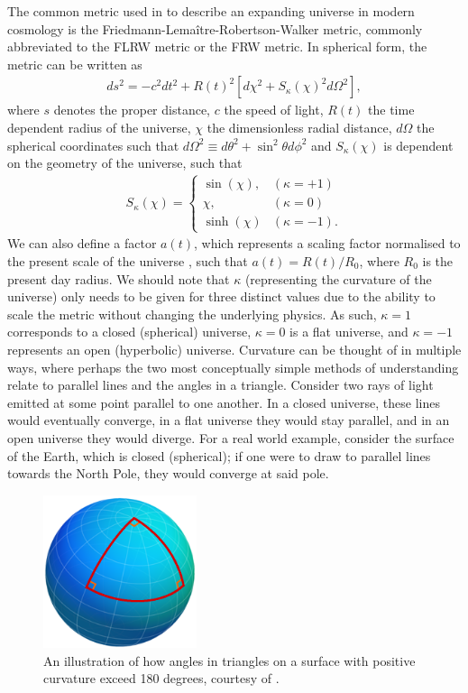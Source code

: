 \documentclass[titlesmallcaps, examinerscopy, copyrightpage]{uqthesis}
\begin{document}
The common metric used in to describe an expanding universe in modern cosmology is the Friedmann-Lema\^itre-Robertson-Walker metric, commonly abbreviated to the FLRW metric or the FRW metric. In spherical form, the metric can be written as
\begin{align}
ds^2 = -c^2 dt^2 + R(t)^2 \left[ d\chi^2 + S_\kappa(\chi)^2 d\Omega^2 \right], 
\end{align}
where $s$ denotes the proper distance, $c$ the speed of light, $R(t)$ the time dependent radius of the universe, $\chi$ the dimensionless radial distance, $d\Omega$ the spherical coordinates such that $d\Omega^2 \equiv d\theta^2 + \sin^2\theta d\phi^2$ and $S_\kappa(\chi)$ is dependent on the geometry of the universe, such that
\begin{align}
S_\kappa(\chi) = \begin{cases}
    \sin(\chi), & (\kappa = +1)\\
    \chi, & (\kappa = 0) \\
    \sinh (\chi) & (\kappa = -1).
  \end{cases}
\end{align}
We can also define a factor $a(t)$, which represents a scaling factor normalised to the present scale of the universe \citep{RydenPartridge2004}, such that $a(t) = R(t)/R_0$, where $R_0$ is the present day radius. We should note that $\kappa$ (representing the curvature of the universe) only needs to be given for three distinct values due to the ability to scale the metric without changing the underlying physics. As such, $\kappa = 1$ corresponds to a closed (spherical) universe, $\kappa = 0$ is a flat universe, and $\kappa = -1$ represents an open (hyperbolic) universe. Curvature can be thought of in multiple ways, where perhaps the two most conceptually simple methods of understanding relate to parallel lines and the angles in a triangle. Consider two rays of light emitted at some point parallel to one another. In a closed universe, these lines would eventually converge, in a flat universe they would stay parallel, and in an open universe they would diverge. For a real world example, consider the surface of the Earth, which is closed (spherical); if one were to draw to parallel lines towards the North Pole, they would converge at said pole. 
\begin{figure}
  \begin{center}
    \includegraphics[width=0.4\textwidth]{images/SphereRightAngle.png}
  \end{center}
  \caption{An illustration of how angles in triangles on a surface with positive curvature exceed 180 degrees, courtesy of \citet{LegnerMathigones}.}
  \label{fig:triangle}
\end{figure}
\end{document}
